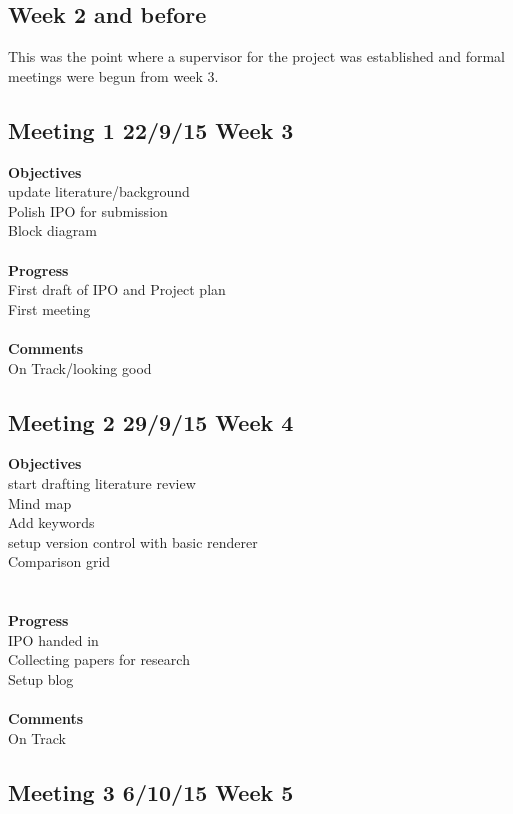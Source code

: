 \subsection{Week 2 and before}
This was the point where a supervisor for the project was established and formal meetings were begun from week 3.

\subsection{Meeting 1 22/9/15 Week 3}

\textbf{Objectives}\\
update literature/background\\
Polish IPO for submission\\
Block diagram\\\\\textbf{Progress}\\
First draft of IPO and Project plan\\
First meeting\\\\\textbf{Comments}\\
On Track/looking good


\subsection{Meeting 2 29/9/15 Week 4}

\textbf{Objectives}\\
start drafting literature review\\
Mind map\\
Add keywords\\
setup version control with basic renderer\\
Comparison grid\\
\\\\\textbf{Progress}\\
IPO handed in\\
Collecting papers for research\\
Setup blog\\\\\textbf{Comments}\\
On Track


\subsection{Meeting 3 6/10/15 Week 5}

